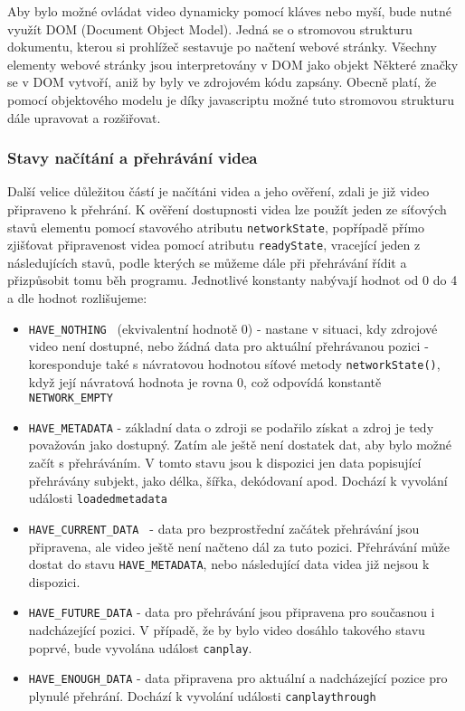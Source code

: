 Aby bylo možné ovládat video dynamicky pomocí kláves nebo myší, bude nutné využít DOM (Document Object Model). Jedná se o stromovou strukturu dokumentu, kterou si prohlížeč sestavuje po načtení webové stránky. Všechny elementy webové stránky jsou interpretovány v DOM jako objekt Některé značky se v DOM vytvoří, aniž by byly ve zdrojovém kódu zapsány. Obecně platí, že pomocí objektového modelu je díky javascriptu možné tuto stromovou strukturu dále upravovat a rozšiřovat. 

\newpage

\subsubsection{Stavy načítání a přehrávání videa}
Další velice důležitou částí je načítáni videa a jeho ověření, zdali  je již video připraveno k přehrání. K ověření dostupnosti videa lze použít jeden ze síťových stavů elementu pomocí stavového atributu \texttt{networkState}, popřípadě přímo zjišťovat připravenost videa pomocí atributu \texttt{readyState}, vracející jeden z následujících stavů, podle kterých se můžeme dále při přehrávání řídit a přizpůsobit tomu běh programu. Jednotlivé konstanty nabývají hodnot od 0 do 4 a dle hodnot rozlišujeme:


\begin{itemize}
	\item \texttt{HAVE\_NOTHING } (ekvivalentní hodnotě 0) \newline
	 - nastane v situaci, kdy zdrojové video není dostupné, nebo žádná data pro aktuální přehrávanou pozici \newline - koresponduje také s návratovou hodnotou síťové metody \texttt{networkState()}, když její návratová hodnota je rovna 0, což odpovídá konstantě \texttt{NETWORK\_EMPTY}
	\item \texttt{HAVE\_METADATA} \newline
		-  základní data o zdroji se podařilo získat a zdroj je tedy považován jako dostupný. Zatím ale ještě není dostatek dat, aby bylo možné začít s přehráváním. V tomto stavu jsou k dispozici jen data popisující přehrávány subjekt, jako délka, šířka, dekódovaní apod. Dochází k vyvolání události \texttt{loadedmetadata}
	\item \texttt{HAVE\_CURRENT\_DATA }\newline
		- data pro bezprostřední začátek přehrávání jsou připravena, ale video ještě není načteno dál za tuto pozici. Přehrávání může dostat do stavu \texttt{HAVE\_METADATA}, nebo následující data videa již nejsou k dispozici.
	\item \texttt{HAVE\_FUTURE\_DATA}\newline
		- data pro přehrávání jsou připravena pro současnou i nadcházející pozici. V případě, že by bylo video dosáhlo takového stavu poprvé, bude vyvolána událost \texttt{canplay}.
	\item \texttt{HAVE\_ENOUGH\_DATA}\newline
		- data připravena pro aktuální a nadcházející pozice pro plynulé přehrání. Dochází k vyvolání události \texttt{canplaythrough}
\end{itemize}

